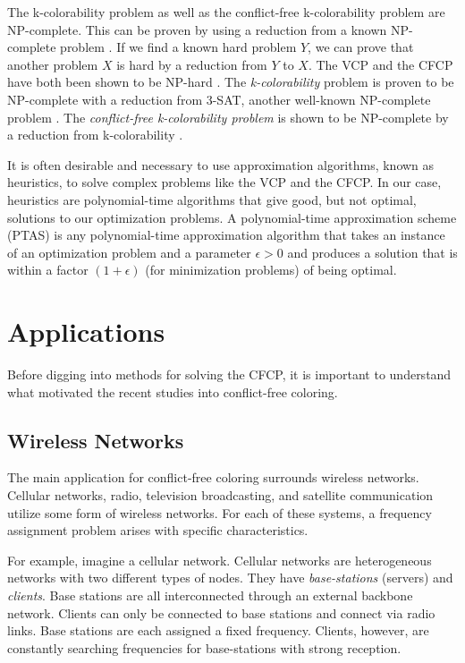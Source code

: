 \documentclass{sig-alternate}
\begin{document}
The k-colorability problem as well as the conflict-free k-colorability problem are NP-complete. This can be proven by using a reduction from a known NP-complete problem \cite{garey2002computers}. If we find a known hard problem $Y$, we can prove that another problem $X$ is hard by a reduction from $Y$ to $X$. The VCP and the CFCP have both been shown to be NP-hard \cite{abel2017three,moret1998theory}. The \emph{k-colorability} problem is proven to be NP-complete with a reduction from 3-SAT, another well-known NP-complete problem \cite{sharma2012new}. The \emph{conflict-free k-colorability problem} is shown to be NP-complete by a reduction from k-colorability \cite{abel2017three}.

It is often desirable and necessary to use approximation algorithms, known as heuristics, to solve complex problems like the VCP and the CFCP. In our case, heuristics are polynomial-time algorithms that give good, but not optimal, solutions to our optimization problems. A polynomial-time approximation scheme (PTAS) is any polynomial-time approximation algorithm that takes an instance of an optimization problem and a parameter $\epsilon > 0$ and produces a solution that is within a factor $(1 + \epsilon)$ (for minimization problems) of being optimal.

\section{Applications}
Before digging into methods for solving the CFCP, it is important to understand what motivated the recent studies into conflict-free coloring.

\subsection{Wireless Networks}
The main application for conflict-free coloring surrounds wireless networks. Cellular networks, radio, television broadcasting, and satellite communication utilize some form of wireless networks. For each of these systems, a frequency assignment problem arises with specific characteristics.

For example, imagine a cellular network. Cellular networks are heterogeneous networks with two different types of nodes. They have \emph{base-stations} (servers) and \emph{clients}. Base stations are all interconnected through an external backbone network. Clients can only be connected to base stations and connect via radio links. Base stations are each assigned a fixed frequency. Clients, however, are constantly searching frequencies for base-stations with strong reception.
\end{document}
